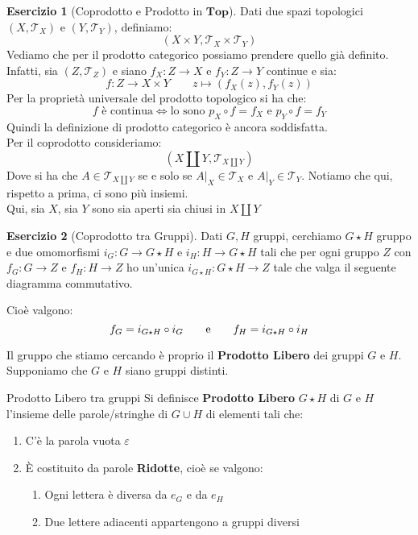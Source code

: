 \documentclass[11pt,a4paper,twoside]{article}
\newcommand{\vareps}{\varepsilon}
\theoremstyle{definition}
\newtheorem*{ese}{Esercizio}
\begin{document}
\begin{ese}[Coprodotto e Prodotto in $\bm{Top}$]
	Dati due spazi topologici $(X, \mathcal T_X)$ e $(Y, \mathcal T_Y)$, definiamo:
	\[ (X \times Y, \mathcal T_X \times \mathcal T_Y) \]
	Vediamo che per il prodotto categorico possiamo prendere quello già definito.\\
	Infatti, sia $(Z, \mathcal T_Z)$ e siano $f_X:Z \to X$ e  $f_Y:Z \to Y$ continue e sia:
	\[ f: Z \to X \times Y\qquad z \mapsto (f_X(z), f_Y(z)) \]
	Per la proprietà universale del prodotto topologico si ha che:
	\[ f\text{ è continua}\Leftrightarrow \text{lo sono }p_X \circ f = f_X \text{ e }p_Y \circ f = f_Y \]
	Quindi la definizione di prodotto categorico è ancora soddisfatta.\\
	Per il coprodotto consideriamo:
	\[ (X \amalg Y, \mathcal T_{X \amalg Y}) \]
	Dove si ha che $A \in \mathcal T_{X \amalg Y}$ se e solo se $A|_X \in \mathcal T_X$ e $A|_Y \in \mathcal T_Y$. Notiamo che qui, rispetto a prima, ci sono più insiemi.\\
	Qui, sia $X$, sia $Y$ sono sia aperti sia chiusi in $X \amalg Y$
\end{ese}

\begin{ese}[Coprodotto tra Gruppi]
	Dati $G, H$ gruppi, cerchiamo $G \star H$ gruppo e due omomorfismi $i_G: G \to G\star H$ e $i_H: H \to G \star H$ tali che per ogni gruppo $Z$ con $f_G:G \to Z$ e $f_H:H \to Z$ ho un'unica $i_{G \star H}:G \star H \to Z$ tale che valga il seguente diagramma commutativo.
	\begin{center}
	\end{center}
	Cioè valgono:
	\[ f_G = i_{G\star H} \circ i_G \qquad \text e \qquad f_H = i_{G \star H} \circ i_H\]
\end{ese}
Il gruppo che stiamo cercando è proprio il \textbf{Prodotto Libero} dei gruppi $G$ e $H$. Supponiamo che $G$ e $H$ siano gruppi distinti.

\begin{defn}{Prodotto Libero tra gruppi}{}
	Si definisce \textbf{Prodotto Libero} $G \star H$ di $G$ e $H$ l'insieme delle parole/stringhe di $G \cup H$ di elementi tali che:
	\begin{enumerate}
		\item C'è la parola vuota $\vareps$
		\item È costituito da parole \textbf{Ridotte}, cioè se valgono:
			\begin{enumerate}
				\item Ogni lettera è diversa da $e_G$ e da $e_H$
				\item Due lettere adiacenti appartengono a gruppi diversi
			\end{enumerate}
	\end{enumerate}
\end{defn}
\end{document}
